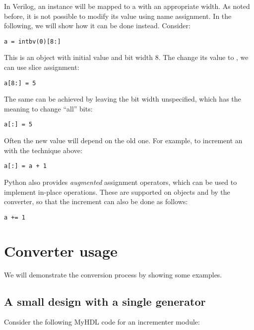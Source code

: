 In Verilog, an  instance will be mapped to a 
with an appropriate width. As noted before, it is not possible
to modify its value using name assignment. In the following, we
will show how it can be done instead. Consider:

\begin{verbatim}
a = intbv(0)[8:]
\end{verbatim}

This is an  object with initial value  and
bit width 8. The change its value to , we can use
slice assignment:

\begin{verbatim}
a[8:] = 5
\end{verbatim}

The same can be achieved by leaving the bit width unspecified, 
which has the meaning to change ``all'' bits:

\begin{verbatim}
a[:] = 5
\end{verbatim}

Often the new value will depend on the old one. For example,
to increment an  with the technique above:

\begin{verbatim}
a[:] = a + 1
\end{verbatim}

Python also provides \emph{augmented} assignment operators,
which can be used to implement in-place operations. These are supported
on  objects and by the converter, so that the increment
can also be done as follows:

\begin{verbatim}
a += 1
\end{verbatim}

\section{Converter usage\label{conv-usage}}

We will demonstrate the conversion process by showing some examples.

\subsection{A small design with a single generator\label{conv-usage-small}}

Consider the following MyHDL code for an incrementer module:

